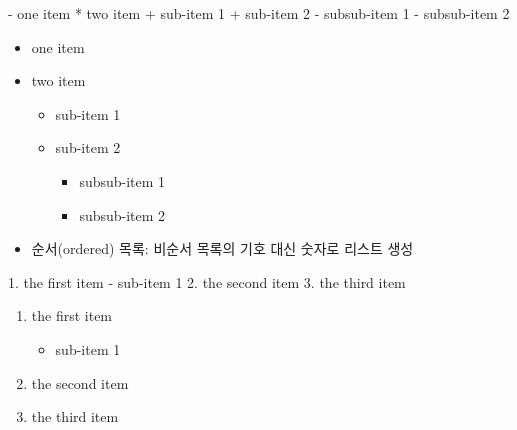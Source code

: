 \documentclass[
  11pt,
]{krantz}
\newenvironment{Shaded}{\begin{snugshade}}{\end{snugshade}}
\newcommand{\NormalTok}[1]{#1}
\newcommand{\SpecialStringTok}[1]{\textcolor[rgb]{0.5,0.5,0.5}{#1}}
\providecommand{\tightlist}{%
  \setlength{\itemsep}{0pt}\setlength{\parskip}{0pt}}
\begin{document}
\begin{Shaded}
\begin{Highlighting}[]
\SpecialStringTok{{-} }\NormalTok{one item }
\SpecialStringTok{* }\NormalTok{two item}
\SpecialStringTok{   + }\NormalTok{sub{-}item 1}
\SpecialStringTok{   + }\NormalTok{sub{-}item 2}
\SpecialStringTok{      {-} }\NormalTok{subsub{-}item 1}
\SpecialStringTok{      {-} }\NormalTok{subsub{-}item 2}
\end{Highlighting}
\end{Shaded}

\begin{itemize}
\tightlist
\item
  one item
\item
  two item

  \begin{itemize}
  \tightlist
  \item
    sub-item 1
  \item
    sub-item 2

    \begin{itemize}
    \tightlist
    \item
      subsub-item 1
    \item
      subsub-item 2
    \end{itemize}
  \end{itemize}
\item
  순서(ordered) 목록: 비순서 목록의 기호 대신 숫자로 리스트 생성
\end{itemize}

\begin{Shaded}
\begin{Highlighting}[]
\SpecialStringTok{1. }\NormalTok{the first item}
\SpecialStringTok{   {-} }\NormalTok{sub{-}item 1}
\SpecialStringTok{2. }\NormalTok{the second item}
\SpecialStringTok{3. }\NormalTok{the third item}
\end{Highlighting}
\end{Shaded}

\begin{enumerate}
\def\labelenumi{\arabic{enumi}.}
\tightlist
\item
  the first item

  \begin{itemize}
  \tightlist
  \item
    sub-item 1
  \end{itemize}
\item
  the second item
\item
  the third item
\end{enumerate}
\end{document}
